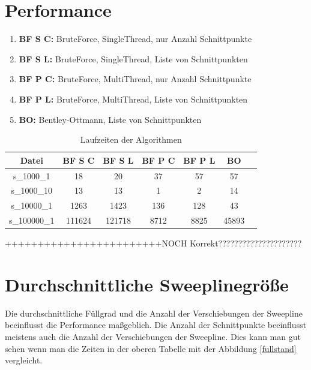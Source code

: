 \documentclass[conference]{IEEEtran}
\begin{document}
	\section{Performance}
	
	\begin{enumerate}
		\item \textbf{BF S C:} BruteForce, SingleThread, nur Anzahl Schnittpunkte
		\item \textbf{BF S L:} BruteForce, SingleThread, Liste von Schnittpunkten
		\item \textbf{BF P C:} BruteForce, MultiThread, nur Anzahl Schnittpunkte
		\item \textbf{BF P L:} BruteForce, MultiThread, Liste von Schnittpunkten
		\item \textbf{BO:} Bentley-Ottmann, Liste von Schnittpunkten
	\end{enumerate}
     
	\begin{table}
		\small
		\begin{tabular}{|c|c|c|c|c|c|c|}
			\hline
			Datei & BF S C & BF S L & BF P C & BF P L & BO \\
			\hline
			s\_1000\_1 & 18 & 20 & 37 & 57 & 57\\
			\hline
			s\_1000\_10 & 13 & 13 & 1 & 2 & 14\\
			\hline
			s\_10000\_1 & 1263 & 1423 & 136 & 128 & 43\\
			\hline
			s\_100000\_1 & 111624 & 121718 & 8712 & 8825 & 45893\\%
			\hline
		\end{tabular}
	    \caption{Laufzeiten der Algorithmen}
	\end{table}
++++++++++++++++++++++++NOCH Korrekt?????????????????????

	
	\section{Durchschnittliche Sweeplinegröße}
	Die durchschnittliche Füllgrad und die Anzahl der Verschiebungen der Sweepline beeinflusst die Performance maßgeblich. Die Anzahl der Schnittpunkte beeinflusst meistens auch die Anzahl der Verschiebungen der Sweepline. Dies kann man gut sehen wenn man die Zeiten in der oberen Tabelle mit der Abbildung \ref{fullstand} vergleicht. 
\end{document}
